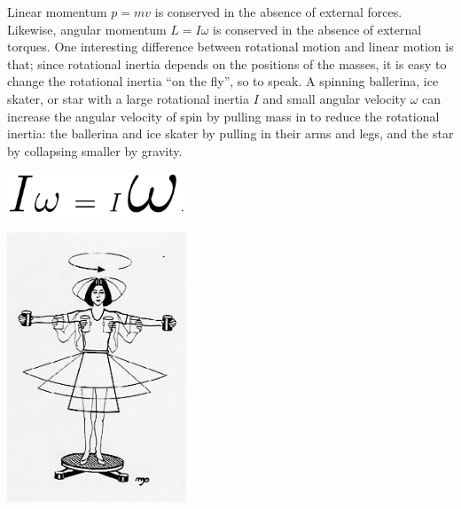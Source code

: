 Linear momentum \(p = mv\) is conserved in the absence of external forces.  Likewise, angular momentum \(L = I\omega\) is conserved in the absence of external torques.  One interesting difference between rotational motion and linear motion is that; since rotational inertia depends on the positions of the masses, it is easy to change the rotational inertia ``on the fly'', so to speak.  A spinning ballerina, ice skater, or star with a large rotational inertia \(I\) and small angular velocity \(\omega\) can increase the angular velocity of spin by pulling mass in to reduce the rotational inertia: the ballerina and ice skater by pulling in their arms and legs, and the star by collapsing smaller by gravity.
\begin{center} \includegraphics*[width=0.4\textwidth]{imgs/6labs/6Alab/6Aexp7/6A_exp7_ConservAngMom.jpg} \end{center}
\begin{center} \includegraphics*[width=0.4\textwidth]{imgs/6labs/6Alab/6Aexp7/r_m.jpg} \end{center}

